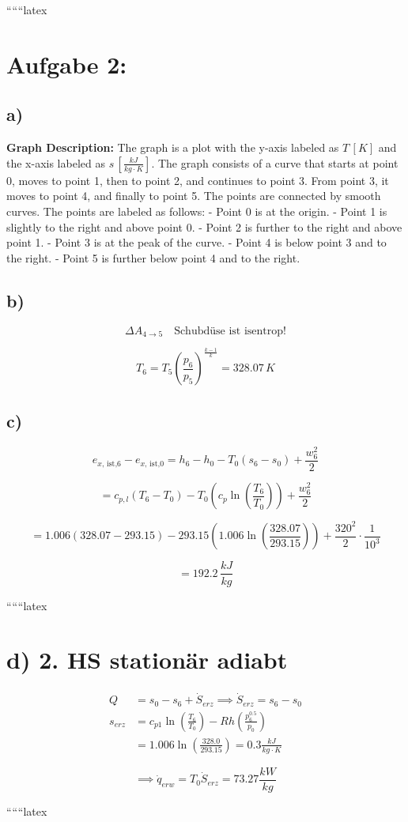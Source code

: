 
``````latex

\section*{Aufgabe 2:}

\subsection*{a)}

\textbf{Graph Description:} The graph is a plot with the y-axis labeled as \( T \, [K] \) and the x-axis labeled as \( s \, [\frac{kJ}{kg \cdot K}] \). The graph consists of a curve that starts at point 0, moves to point 1, then to point 2, and continues to point 3. From point 3, it moves to point 4, and finally to point 5. The points are connected by smooth curves. The points are labeled as follows:
- Point 0 is at the origin.
- Point 1 is slightly to the right and above point 0.
- Point 2 is further to the right and above point 1.
- Point 3 is at the peak of the curve.
- Point 4 is below point 3 and to the right.
- Point 5 is further below point 4 and to the right.

\subsection*{b)}

\[
\Delta A_{4 \rightarrow 5} \quad \text{Schubdüse ist isentrop!}
\]

\[
T_6 = T_5 \left( \frac{p_6}{p_5} \right)^{\frac{k-1}{k}} = 328.07 \, K
\]

\subsection*{c)}

\[
e_{x, \, \text{ist,6}} - e_{x, \, \text{ist,0}} = h_6 - h_0 - T_0 (s_6 - s_0) + \frac{w_6^2}{2}
\]

\[
= c_{p,l} (T_6 - T_0) - T_0 \left( c_p \ln \left( \frac{T_6}{T_0} \right) \right) + \frac{w_6^2}{2}
\]

\[
= 1.006 \left( 328.07 - 293.15 \right) - 293.15 \left( 1.006 \ln \left( \frac{328.07}{293.15} \right) \right) + \frac{320^2}{2} \cdot \frac{1}{10^3}
\]

\[
= 192.2 \, \frac{kJ}{kg}
\]

``````latex


\section*{d) 2. HS stationär adiabt}

\begin{align*}
Q &= s_0 - s_6 + \dot{S}_{erz} \implies \dot{S}_{erz} = s_6 - s_0 \\
s_{erz} &= c_{p1} \ln \left( \frac{T_6}{T_0} \right) - R h \left( \frac{p_6^{0.5}}{p_0} \right) \\
&= 1.006 \ln \left( \frac{328.0}{293.15} \right) = 0.3 \frac{kJ}{kg \cdot K}
\end{align*}

\[
\implies \dot{q}_{erw} = T_0 \dot{S}_{erz} = 73.27 \frac{kW}{kg}
\]

``````latex


